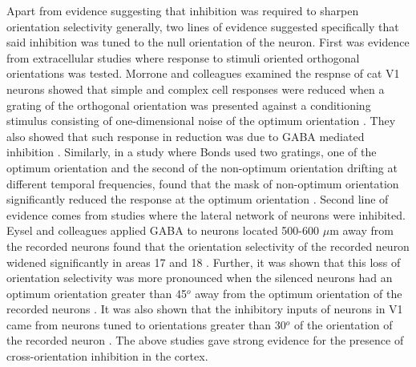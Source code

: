 Apart from evidence suggesting that inhibition was required to sharpen orientation selectivity generally, two lines of evidence suggested specifically that said inhibition was tuned to the null orientation of the neuron. First was evidence from extracellular studies where response to stimuli oriented orthogonal orientations was tested. Morrone and colleagues examined the respnse of cat V1 neurons showed that simple and complex cell responses were reduced when a grating of the orthogonal orientation was presented against a conditioning stimulus consisting of one-dimensional noise of the optimum orientation \cite{Morrone1982}. They also showed that such response in reduction was due to GABA mediated inhibition \cite{Morrone1987}. Similarly, in a study where Bonds used two gratings, one of the optimum orientation and the second of the non-optimum orientation drifting at different temporal frequencies, found that the mask of non-optimum orientation significantly reduced the response at the optimum orientation \cite{Bonds1989}. Second line of evidence comes from studies where the lateral network of neurons were inhibited. Eysel and colleagues applied GABA to neurons located 500-600 $\mu$m away from the recorded neurons found that the orientation selectivity of the recorded neuron widened significantly in areas 17 and 18 \cite{Worgotter1988, Eysel1990, Crook1992}. Further, it was shown that this loss of orientation selectivity was more pronounced when the silenced neurons had an optimum orientation greater than 45$^o$ away from the optimum orientation of the recorded neurons \cite{Crook1992, Crook1997}. It was also shown that the inhibitory inputs of neurons in V1 came from neurons tuned to orientations greater than 30$^o$ of the orientation of the recorded neuron \cite{Kisvarday1997}. The above studies gave strong evidence for the presence of cross-orientation inhibition in the cortex.


